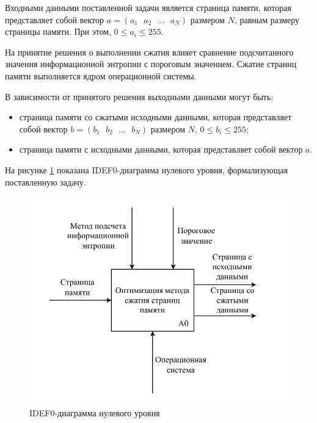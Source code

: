 Входными данными поставленной задачи является страница памяти, которая представляет собой вектор $a = (a_1\text{ }a_2\text{ }\dotso\text{ }a_N)$ размером $N$, равным размеру страницы памяти. При этом, $0 \leq a_i \leq 255$.

На принятие решения о выполнении сжатия влияет сравнение подсчитанного значения информационной энтропии с пороговым значением. Сжатие страниц памяти выполняется ядром операционной системы.

В зависимости от принятого решения выходными данными могут быть:
\begin{itemize}
	\item страница памяти со сжатыми исходными данными, которая представляет собой вектор $b = (b_1\text{ }b_2\text{ }\dotso\text{ }b_N)$ размером $N$, $0 \leq b_i \leq 255$;
    \item страница памяти с исходными данными, которая представляет собой вектор $a$.
\end{itemize}

На рисунке \ref{img:zero-level} показана IDEF0-диаграмма нулевого уровня, формализующая поставленную задачу.

\begin{figure}[H]
	\begin{center}
		\includegraphics[scale=0.7]{inc/img/zero-level.pdf}
	\end{center}
	\captionsetup{justification=centering}
	\caption{IDEF0-диаграмма нулевого уровня}
	\label{img:zero-level}
\end{figure}

